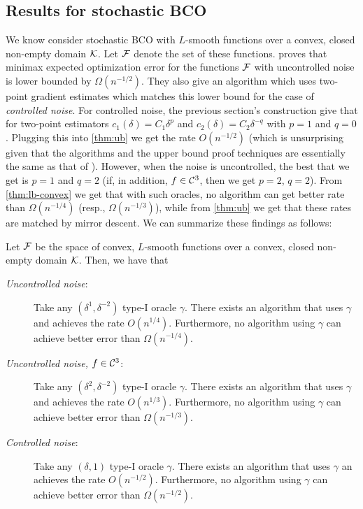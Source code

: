 \subsection{Results for stochastic BCO}
We know consider stochastic BCO with $L$-smooth functions over a convex, closed non-empty domain $\mathcal{K}$. 
Let $\mathcal{F}$ denote the set of these functions.
\cite{duchi2015optimal} proves that minimax expected optimization error
for the functions $\mathcal{F}$ with uncontrolled noise is lower bounded by $\Omega(n^{-1/2})$. 
They also give an algorithm which uses two-point gradient estimates which matches this lower bound for the case of \emph{controlled noise}.
For controlled noise, the previous section's construction give that for two-point estimators $c_1(\delta) = C_1 \delta^p$ and $c_2(\delta) = C_2\delta^{-q}$ with $p=1$ and $q=0$. Plugging this into
\cref{thm:ub} we get the rate $O(n^{-1/2})$ (which is unsurprising
given that the algorithms and the upper bound proof techniques are essentially the same as that of \cite{duchi2015optimal}).
However, when the noise is uncontrolled, the best that we get is $p=1$ and $q=2$ (if, in addition, $f\in \mathcal{C}^3$, then we get $p=2$, $q=2$).
From \cref{thm:lb-convex} we get that with such oracles, no algorithm can get better rate than $\Omega(n^{-1/4})$ (resp., $\Omega(n^{-1/3})$), while from
\cref{thm:ub} we get that these rates are matched by mirror descent.
We can summarize these findings as follows:
\begin{theorem}\label{thm:aaab}
Let $\mathcal{F}$ be the space of convex, $L$-smooth functions over a convex, closed non-empty domain $\mathcal{K}$.
Then, we have that
\begin{description}
\item[\textit{Uncontrolled noise}:]
Take any $(\delta^1,\delta^{-2})$ type-I oracle $\gamma$.
There exists an algorithm that uses $\gamma$
and achieves the rate $O(n^{1/4})$.
Furthermore, no algorithm using $\gamma$
 can achieve better error than $\Omega(n^{-1/4})$.
\item[\textit{Uncontrolled noise, $f\in \mathcal{C}^3$}:]
Take any $(\delta^2,\delta^{-2})$ type-I oracle $\gamma$.
There exists an algorithm that uses $\gamma$
and achieves the rate $O(n^{1/3})$.
Furthermore, no algorithm using $\gamma$
 can achieve better error than $\Omega(n^{-1/3})$.
\item[\textit{Controlled noise}:]
Take any $(\delta,1)$ type-I oracle $\gamma$.
There exists an algorithm that uses $\gamma$ an
achieves the rate $O(n^{-1/2})$.
Furthermore, no algorithm using $\gamma$
 can achieve better error than $\Omega(n^{-1/2})$.
\end{description}
\end{theorem}


